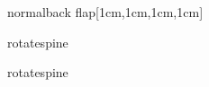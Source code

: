 \documentclass[coverwidth=148mm, coverheight=210mm, spinewidth=37mm,
flapwidth=7cm, wrapwidth=3mm, 11pt]{bookcover}
\begin{document}
\begin{bookcover}
\begin{bookcoverelement}{normal}{back flap}[1cm,1cm,1cm,1cm]
  \end{bookcoverelement}
  
  \begin{bookcoverelement}{rotate}{spine}
    \color{orange!70!white}

   \LARGE\sffamily\bfseries
   \hspace{.03\partheight}

  \end{bookcoverelement}
  

  \begin{bookcoverelement}{rotate}{spine}
    \color{orange!70!white}%
    \fontsize{32}{40}\selectfont\sffamily\bfseries%
    \hspace{.42\partheight}    
  \end{bookcoverelement}

\end{bookcover}
\end{document}
